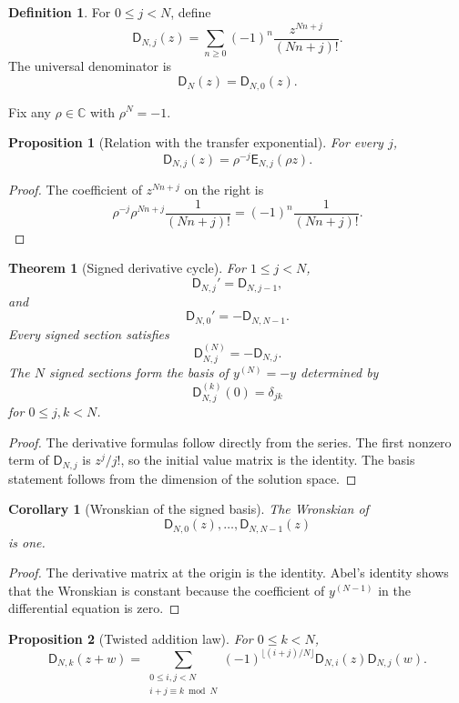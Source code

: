 \documentclass{aomart}
\newtheorem{theorem}{Theorem}[section]
\newtheorem{proposition}[proposition]{Proposition}
\newtheorem{corollary}[corollary]{Corollary}
\theoremstyle{definition}
\newtheorem{definition}[definition]{Definition}
\theoremstyle{remark}
\newcommand{\CC}{\mathbb C}
\newcommand{\Dfun}{\mathsf D}
\newcommand{\Efun}{\mathsf E}
\begin{document}
\begin{definition}\label{def:signed_sections}
For $0\leq j<N$, define
\[
\Dfun_{N,j}(z)
=
\sum_{n\geq0}(-1)^n\frac{z^{Nn+j}}{(Nn+j)!}.
\]
The universal denominator is
\[
\Dfun_N(z)=\Dfun_{N,0}(z).
\]
\end{definition}

Fix any $\rho\in\CC$ with $\rho^N=-1$.

\begin{proposition}[Relation with the transfer exponential]\label{prop:signed_exponential_relation}
For every $j$,
\[
\Dfun_{N,j}(z)
=
\rho^{-j}\Efun_{N,j}(\rho z).
\]
\end{proposition}

\begin{proof}
The coefficient of $z^{Nn+j}$ on the right is
\[
\rho^{-j}\rho^{Nn+j}\frac1{(Nn+j)!}
=
(-1)^n\frac1{(Nn+j)!}.
\]
\end{proof}

\begin{theorem}[Signed derivative cycle]\label{thm:signed_cycle}
For $1\leq j<N$,
\[
\Dfun_{N,j}'=\Dfun_{N,j-1},
\]
and
\[
\Dfun_{N,0}'=-\Dfun_{N,N-1}.
\]
Every signed section satisfies
\[
\Dfun_{N,j}^{(N)}=-\Dfun_{N,j}.
\]
The $N$ signed sections form the basis of $y^{(N)}=-y$ determined by
\[
\Dfun_{N,j}^{(k)}(0)=\delta_{jk}
\]
for $0\leq j,k<N$.
\end{theorem}

\begin{proof}
The derivative formulas follow directly from the series.  The first nonzero term of $\Dfun_{N,j}$ is $z^j/j!$, so the initial value matrix is the identity.  The basis statement follows from the dimension of the solution space.
\end{proof}

\begin{corollary}[Wronskian of the signed basis]\label{cor:signed_wronskian}
The Wronskian of
\[
\Dfun_{N,0}(z),\ldots,\Dfun_{N,N-1}(z)
\]
is one.
\end{corollary}

\begin{proof}
The derivative matrix at the origin is the identity.  Abel's identity shows that the Wronskian is constant because the coefficient of $y^{(N-1)}$ in the differential equation is zero.
\end{proof}


\begin{proposition}[Twisted addition law]\label{prop:signed_addition}
For $0\leq k<N$,
\[
\Dfun_{N,k}(z+w)
=
\sum_{\substack{0\leq i,j<N\\ i+j\equiv k\bmod N}}
(-1)^{\lfloor(i+j)/N\rfloor}
\Dfun_{N,i}(z)\Dfun_{N,j}(w).
\]
\end{proposition}
\end{document}
